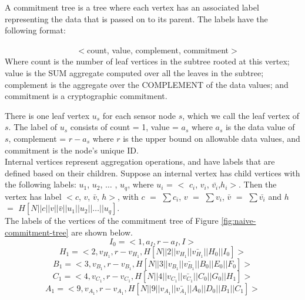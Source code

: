 			\begin{definition}
				\cite{chan2006secure}
				\label{def:label}
				A commitment tree is a tree where each vertex has an associated label representing the data that is passed on to its parent. The labels have the following format:

				$\hspace{100pt}$ $<$count, value, complement, commitment$>$\\
				Where count is the number of leaf vertices in the subtree rooted at this vertex; value is the SUM aggregate computed over all the leaves in the subtree; complement is the aggregate over the COMPLEMENT of the data values; and commitment is a cryptographic commitment.
			\end{definition}
			There is one leaf vertex $u_{s}$ for each sensor node $s$, which we call the leaf vertex of $s$. The label of $u_{s}$ consists of count = 1, value = $a_{s}$ where $a_{s}$ is the data value of $s$, complement = $r - a_{s}$ where $r$ is the upper bound on allowable data values, and commitment is the node’s unique ID.\\
			Internal vertices represent aggregation operations, and have labels that are defined based on their children. Suppose an internal vertex has child vertices with the following labels: $u_{1}$, $u_{2}$, $\dotsc$ , $u_{q}$, where $u_{i}$ = $<$ $c_{i}$, $v_{i}$, $\bar{v_{i}}$,$h_{i}$$>$. 
			Then the vertex has label $<$$c$, $v$, $\bar{v}$, $h$$>$, with $c$ $=$ $\sum c_{i}$, $v$ $=$ $\sum v_{i}$, $\bar{v}$ $=$ $\sum \bar{v_{i}}$ and $h$ $=$ $H[N||c||v||\bar{v}||u_{1}||u_{2}|| \dotsc ||u_{q}]$.\\
			The labels of the vertices of the commitment tree of Figure \ref{fig:naive-commitment-tree} are shown below.
			\begin{equation}
				I_{0} = <1, a_{I}, r - a_{I}, I>
				\label{eq:label-1}
			\end{equation}
			\begin{equation}
				H_{1} = <2, v_{H_{1}}, r - v_{H_{1}}, H[N||2||v_{H_{1}}||\bar{v_{H_{1}}}||H_{0}||I_{0}]>
				\label{eq:label-2}
			\end{equation}
			\begin{equation}
				B_{1} = <3, v_{B_{1}}, r - v_{B_{1}}, H[N||3||v_{B_{1}}||\bar{v_{B_{1}}}||B_{0}||E_{0}||F_{0}]>
				\label{eq:label-3}
			\end{equation}
			\begin{equation}
				C_{1} = <4, v_{C_{1}}, r - v_{C_{1}}, H[N||4||v_{C_{1}}||\bar{v_{C_{1}}}||C_{0}||G_{0}||H_{1}]>
				\label{eq:label-4}
			\end{equation}
			\begin{equation}
				A_{1} = <9, v_{A_{1}}, r - v_{A_{1}}, H[N||9||v_{A_{1}}||\bar{v_{A_{1}}}||A_{0}||D_{0}||B_{1}||C_{1}]>
				\label{eq:label-5}
			\end{equation}
		
